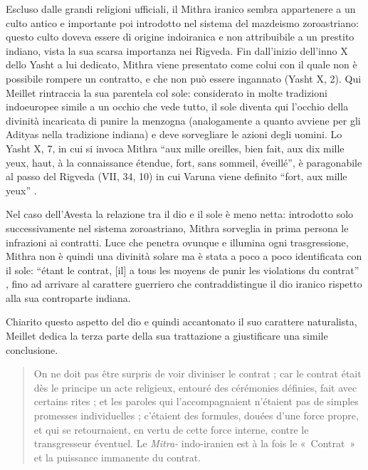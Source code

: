 \documentclass[output=paper]{langsci/langscibook}
\begin{document}
Escluso dalle grandi religioni ufficiali, il Mithra iranico sembra appartenere a un culto antico e importante poi introdotto nel sistema del mazdeismo zoroastriano: questo culto doveva essere di origine indoiranica e non attribuibile a un prestito indiano, vista la sua scarsa importanza nei Rigveda. 
Fin dall'inizio dell’inno X dello Yasht a lui dedicato, Mithra viene presentato come colui con il quale non è possibile rompere un contratto, e che non può essere ingannato (Yasht X, 2). Qui Meillet rintraccia la sua parentela col sole: considerato in molte tradizioni indoeuropee simile a un occhio che vede tutto, il sole diventa qui l’occhio della divinità incaricata di punire la menzogna (analogamente a quanto avviene per gli Adityas nella tradizione indiana) e deve sorvegliare le azioni degli uomini. Lo Yasht X, 7, in cui si invoca Mithra “aux mille oreilles, bien fait, aux dix mille yeux, haut, à la connaissance étendue, fort, sans sommeil, éveillé”, è paragonabile al passo del Rigveda (VII, 34, 10) in cui Varuna viene definito “fort, aux mille yeux” \citep[150]{meillet_dieu_1907-1}.

Nel caso dell’Avesta la relazione tra il dio e il sole è meno netta: introdotto solo successivamente nel sistema zoroastriano, Mithra sorveglia in prima persona le infrazioni ai contratti. Luce che penetra ovunque e illumina ogni trasgressione, Mithra non è quindi una divinità solare ma è stata a poco a poco identificata con il sole: “étant le contrat, [il] a tous les moyens de punir les violations du contrat” \citep[153]{meillet_dieu_1907-1}, fino ad arrivare al carattere guerriero che contraddistingue il dio iranico rispetto alla sua controparte indiana.

Chiarito questo aspetto del dio e quindi accantonato il suo carattere naturalista, Meillet dedica la terza parte della sua trattazione a giustificare una simile conclusione. 

\begin{quote}
    On ne doit pas être surpris de voir diviniser le contrat ; car le contrat était dès le principe un acte religieux, entouré des cérémonies définies, fait avec certains rites ; et les paroles qui l’accompagnaient n’étaient pas de simples promesses individuelles ; c’étaient des formules, douées d’une force propre, et qui se retournaient, en vertu de cette force interne, contre le transgresseur éventuel. Le \textit{Mitra-} indo-iranien est à la fois le «~Contrat~» et la puissance immanente du contrat. \citep[156]{meillet_dieu_1907-1}
\end{quote}
\end{document}
